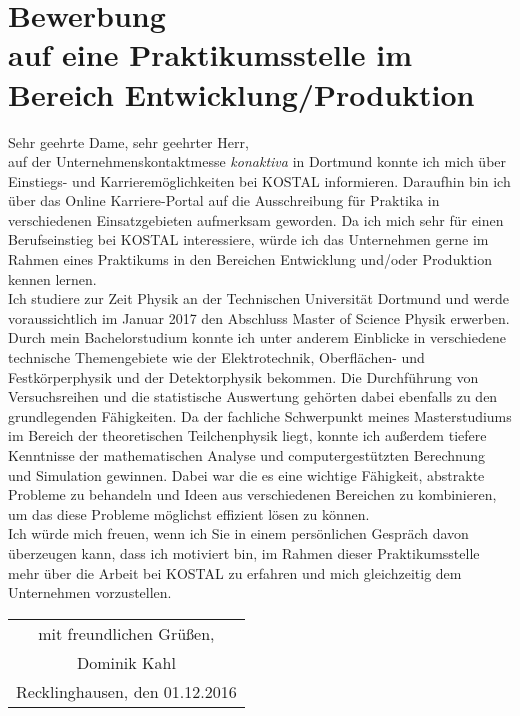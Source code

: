\documentclass[12pt]{scrartcl}
\begin{document}
\pagestyle{empty}

\section*{Bewerbung \\
auf eine Praktikumsstelle im Bereich Entwicklung/Produktion}

\vspace{0.7in}

Sehr geehrte Dame, sehr geehrter Herr,
\\

auf der Unternehmenskontaktmesse \textit{konaktiva} in Dortmund konnte 
ich mich über Ein\-stiegs- und 
Karrieremöglichkeiten bei KOSTAL informieren. Daraufhin bin ich über das 
Online Karriere-Portal auf die Ausschreibung für Praktika in verschiedenen Einsatzgebieten aufmerksam geworden. Da ich mich sehr für einen 
Berufseinstieg bei KOSTAL interessiere, würde ich das Unternehmen gerne im 
Rahmen eines Praktikums in den Bereichen Entwicklung und/oder Produktion 
kennen lernen.
\\

Ich studiere zur Zeit Physik an der Technischen Universität Dortmund und 
werde voraussichtlich im Januar 2017 den Abschluss Master of Science Physik 
erwerben. Durch mein Bachelorstudium konnte ich unter anderem Einblicke in 
verschiedene 
technische Themengebiete wie der Elektrotechnik, Oberflächen- und 
Festkörperphysik und der Detektorphysik bekommen. Die Durchführung von 
Versuchsreihen und die 
statistische Auswertung gehörten dabei ebenfalls zu den grundlegenden 
Fähigkeiten. Da der fachliche Schwerpunkt 
meines Masterstudiums im Bereich der theoretischen Teilchenphysik liegt, konnte 
ich außerdem tiefere Kenntnisse der mathematischen Analyse und 
computergestützten Berechnung und Simulation gewinnen. Dabei war die es eine 
wichtige Fähigkeit, 
abstrakte Probleme zu behandeln und Ideen aus verschiedenen Bereichen zu 
kombinieren, um das diese Probleme möglichst effizient lösen zu können.
\\

Ich würde mich freuen, wenn ich Sie in einem persönlichen Gespräch davon 
überzeugen kann, dass ich motiviert bin, im Rahmen dieser Praktikumsstelle 
mehr über die Arbeit bei KOSTAL zu erfahren und mich gleichzeitig dem 
Unternehmen vorzustellen.
\\[0.4cm]

\begin{flushright}
\begin{tabular}{c}
mit freundlichen Grüßen, 		\\[0.3cm]
Dominik Kahl 					\\[0.3cm]
Recklinghausen, den 01.12.2016 	\\[0.5cm]
\end{tabular}
\end{flushright}
\end{document}
